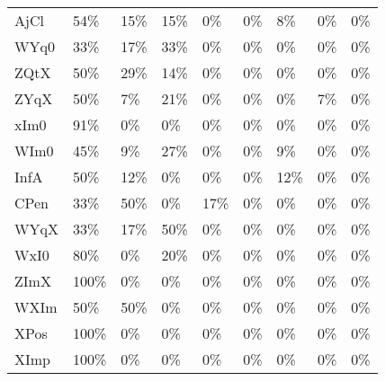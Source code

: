 \begin{table}[htbp!]
\begin{adjustbox}{width=1\textwidth}
\begin{tabular}{lllllllll}
AjCl        &          54\% &        15\% &          15\% &        0\% &            0\% &       8\% &           0\% &            0\% \\
WYq0        &          33\% &        17\% &          33\% &        0\% &            0\% &       0\% &           0\% &            0\% \\
ZQtX        &          50\% &        29\% &          14\% &        0\% &            0\% &       0\% &           0\% &            0\% \\
ZYqX        &          50\% &         7\% &          21\% &        0\% &            0\% &       0\% &           7\% &            0\% \\
xIm0        &          91\% &         0\% &           0\% &        0\% &            0\% &       0\% &           0\% &            0\% \\
WIm0        &          45\% &         9\% &          27\% &        0\% &            0\% &       9\% &           0\% &            0\% \\
InfA        &          50\% &        12\% &           0\% &        0\% &            0\% &      12\% &           0\% &            0\% \\
CPen        &          33\% &        50\% &           0\% &       17\% &            0\% &       0\% &           0\% &            0\% \\
WYqX        &          33\% &        17\% &          50\% &        0\% &            0\% &       0\% &           0\% &            0\% \\
WxI0        &          80\% &         0\% &          20\% &        0\% &            0\% &       0\% &           0\% &            0\% \\
ZImX        &         100\% &         0\% &           0\% &        0\% &            0\% &       0\% &           0\% &            0\% \\
WXIm        &          50\% &        50\% &           0\% &        0\% &            0\% &       0\% &           0\% &            0\% \\
XPos        &         100\% &         0\% &           0\% &        0\% &            0\% &       0\% &           0\% &            0\% \\
XImp        &         100\% &         0\% &           0\% &        0\% &            0\% &       0\% &           0\% &            0\% \\
\bottomrule
\end{tabular}
\end{adjustbox}
\end{table}
